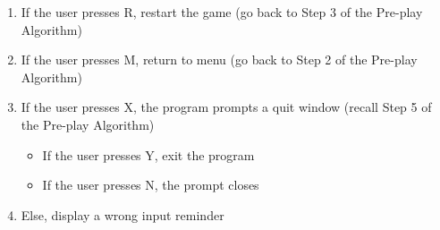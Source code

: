 \begin{enumerate}
        \begin{enumerate}[label=\alph*]
            \item If the user presses R, restart the game (go back to Step 3 of the Pre-play Algorithm)
            \item If the user presses M, return to menu (go back to Step 2 of the Pre-play Algorithm)
            \item If the user presses X, the program prompts a quit window (recall Step 5 of the Pre-play Algorithm)
                \begin{itemize}[label={}]
                    \item If the user presses Y, exit the program
                    \item If the user presses N, the prompt closes
                \end{itemize}
            \item Else, display a wrong input reminder
        \end{enumerate}
\end{enumerate}
